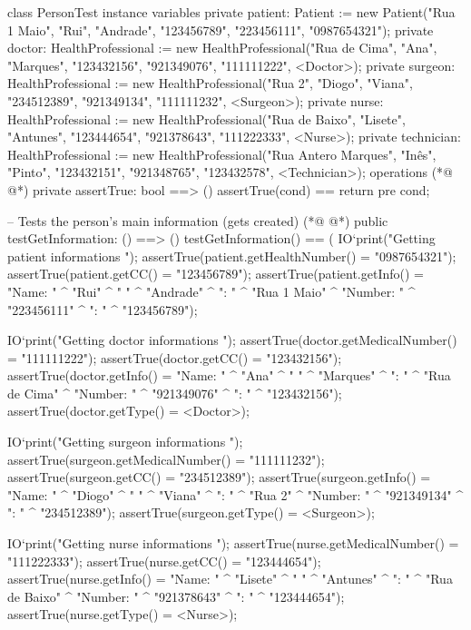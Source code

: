 \begin{vdmpp}[breaklines=true]
class PersonTest
instance variables
 private patient: Patient := new Patient("Rua 1 Maio", "Rui", "Andrade", "123456789", "223456111", "0987654321");
 private doctor: HealthProfessional := new HealthProfessional("Rua de Cima", "Ana", "Marques", "123432156", "921349076", "111111222", <Doctor>);
 private surgeon: HealthProfessional := new HealthProfessional("Rua 2", "Diogo", "Viana", "234512389", "921349134", "111111232", <Surgeon>);
 private nurse: HealthProfessional := new HealthProfessional("Rua de Baixo", "Lisete", "Antunes", "123444654", "921378643", "111222333", <Nurse>);
 private technician: HealthProfessional := new HealthProfessional("Rua Antero Marques", "Inês", "Pinto", "123432151", "921348765", "123432578", <Technician>);
operations
(*@
\label{assertTrue:9}
@*)
 private assertTrue: bool ==> ()
  assertTrue(cond) == return
 pre cond;
 
 -- Tests the person's main information (gets created)
(*@
\label{testGetInformation:14}
@*)
 public testGetInformation: () ==> ()
  testGetInformation() == (
   IO`print("\n Getting patient informations \n");
   assertTrue(patient.getHealthNumber() = "0987654321");
   assertTrue(patient.getCC() = "123456789");
   assertTrue(patient.getInfo() = "Name: " ^ "Rui" ^ " " ^ "Andrade" ^ "\nAddress: " ^ "Rua 1 Maio" ^ "\nPhone Number: " ^ "223456111" ^ "\nCC: " ^ "123456789");
   
   IO`print("\n Getting doctor informations \n");
   assertTrue(doctor.getMedicalNumber() = "111111222");
   assertTrue(doctor.getCC() = "123432156");
   assertTrue(doctor.getInfo() = "Name: " ^ "Ana" ^ " " ^ "Marques" ^ "\nAddress: " ^ "Rua de Cima" ^ "\nPhone Number: " ^ "921349076" ^ "\nCC: " ^ "123432156");
   assertTrue(doctor.getType() = <Doctor>);
   
   IO`print("\n Getting surgeon informations \n");
   assertTrue(surgeon.getMedicalNumber() = "111111232");
   assertTrue(surgeon.getCC() = "234512389");
   assertTrue(surgeon.getInfo() = "Name: " ^ "Diogo" ^ " " ^ "Viana" ^ "\nAddress: " ^ "Rua 2" ^ "\nPhone Number: " ^ "921349134" ^ "\nCC: " ^ "234512389");
   assertTrue(surgeon.getType() = <Surgeon>);
   
   IO`print("\n Getting nurse informations \n");
   assertTrue(nurse.getMedicalNumber() = "111222333");
   assertTrue(nurse.getCC() = "123444654");
   assertTrue(nurse.getInfo() = "Name: " ^ "Lisete" ^ " " ^ "Antunes" ^ "\nAddress: " ^ "Rua de Baixo" ^ "\nPhone Number: " ^ "921378643" ^ "\nCC: " ^ "123444654");
   assertTrue(nurse.getType() = <Nurse>);
   

\end{vdmpp}
